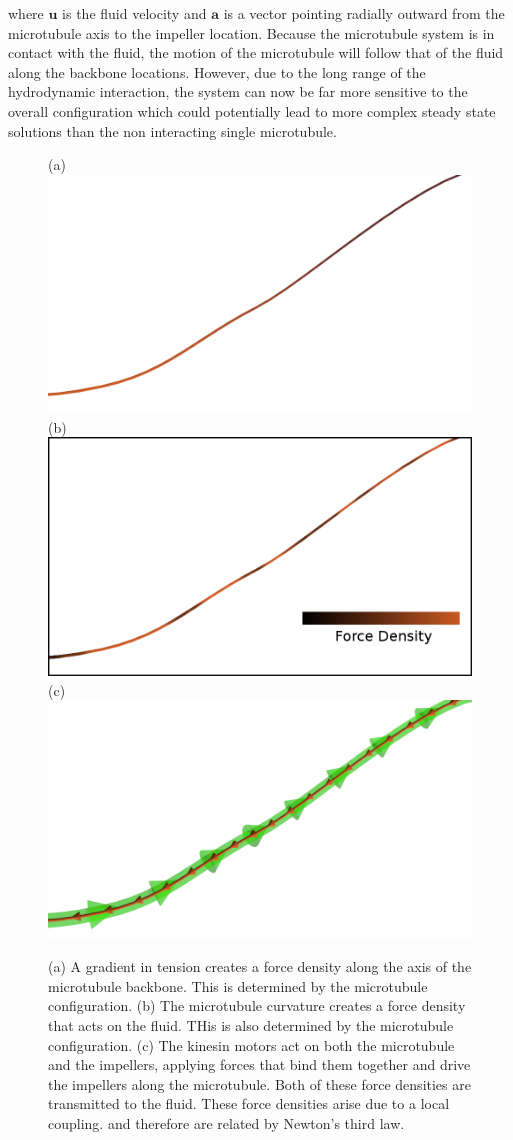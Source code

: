 \documentclass[11pt]{ucthesis}
\begin{document}
where $ \mathbf{u}$ is the fluid velocity and $ \mathbf{a}$ is a vector pointing radially outward from the microtubule axis to the impeller location. 
Because the microtubule system is in contact with the fluid, the motion of the microtubule will follow that of the fluid along the backbone locations.
However, due to the long range of the hydrodynamic interaction, the system can now be far more sensitive to the overall configuration which could potentially lead to more complex steady state solutions than the non interacting single microtubule.


\begin{figure}[htp]
\begin{center}
(a)
\includegraphics[width=0.45\hsize]{gradforces.png}
(b)
\includegraphics[width=0.45\hsize]{stiffforces2.png}
(c)
\includegraphics[width=0.45\hsize]{ktforces.png}
\caption{ 
(a)
A gradient in tension creates a force density along the axis of the microtubule backbone. This is determined by the microtubule configuration.
(b)
The microtubule curvature creates a force density that acts on the fluid. THis is also determined by the microtubule configuration.
(c)
The kinesin motors act on both the microtubule and the impellers, applying forces that bind them together and drive the impellers along the microtubule. Both of these force densities are transmitted to the fluid. These force densities arise due to a local coupling. and therefore are related by Newton's third law.
}
\label{fig:forcedensities}
\end{center}
\end{figure}
\end{document}

